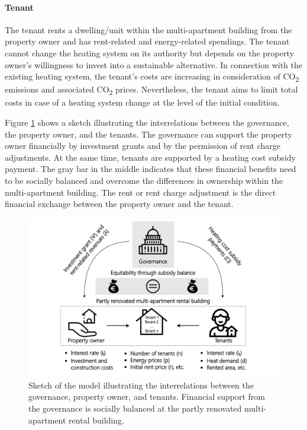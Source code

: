 \paragraph{Tenant} The tenant rents a dwelling/unit within the multi-apartment building from the property owner and has rent-related and energy-related spendings. The tenant cannot change the heating system on its authority but depends on the property owner's willingness to invest into a sustainable alternative. In connection with the existing heating system, the tenant's costs are increasing in consideration of CO\textsubscript{2} emissions and associated CO\textsubscript{2} prices. Nevertheless, the tenant aims to limit total costs in case of a heating system change at the level of the initial condition.\vspace{0.5cm}

Figure \ref{fig:methodology} shows a sketch illustrating the interrelations between the governance, the property owner, and the tenants. The governance can support the property owner financially by investment grants and by the permission of rent charge adjustments. At the same time, tenants are supported by a heating cost subsidy payment. The gray bar in the middle indicates that these financial benefits need to be socially balanced and overcome the differences in ownership within the multi-apartment building. The rent or rent charge adjustment is the direct financial exchange between the property owner and the tenant.\vspace{0.5cm}

\begin{figure}[h]
	\centering
	\includegraphics[width=0.85\linewidth]{figures/3_Methodology/Sketch.pdf}
	\caption{Sketch of the model illustrating the interrelations between the governance, property owner, and tenants. Financial support from the governance is socially balanced at the partly renovated multi-apartment rental building.}
	\label{fig:methodology}
\end{figure}

